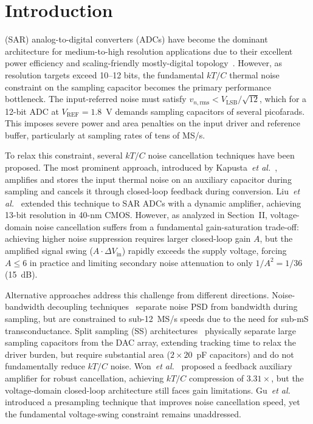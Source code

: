 \documentclass[journal]{IEEEtran}
\begin{document}
\section{Introduction}
 (SAR) analog-to-digital converters (ADCs) have become the dominant architecture for medium-to-high resolution applications due to their excellent power efficiency and scaling-friendly mostly-digital topology~\cite{murmann2015adc,harpe2019sar}. However, as resolution targets exceed 10--12 bits, the fundamental $kT/C$ thermal noise constraint on the sampling capacitor becomes the primary performance bottleneck. The input-referred noise must satisfy $v_{n,\text{rms}} < V_{\text{LSB}}/\sqrt{12}$, which for a 12-bit ADC at $V_{\text{REF}}=1.8$~V demands sampling capacitors of several picofarads. This imposes severe power and area penalties on the input driver and reference buffer, particularly at sampling rates of tens of MS/s.

To relax this constraint, several $kT/C$ noise cancellation techniques have been proposed. The most prominent approach, introduced by Kapusta~\textit{et al.}~\cite{kapusta2014sampling}, amplifies and stores the input thermal noise on an auxiliary capacitor during sampling and cancels it through closed-loop feedback during conversion. Liu~\textit{et al.}~\cite{liu202013bit} extended this technique to SAR ADCs with a dynamic amplifier, achieving 13-bit resolution in 40-nm CMOS. However, as analyzed in Section~II, voltage-domain noise cancellation suffers from a fundamental gain-saturation trade-off: achieving higher noise suppression requires larger closed-loop gain $A$, but the amplified signal swing ($A\cdot\Delta V_{\text{in}}$) rapidly exceeds the supply voltage, forcing $A\leq 6$ in practice and limiting secondary noise attenuation to only $1/A^2 = 1/36$ (15~dB).

Alternative approaches address this challenge from different directions. Noise-bandwidth decoupling techniques~\cite{li2020_SAR} separate noise PSD from bandwidth during sampling, but are constrained to sub-12~MS/s speeds due to the need for sub-mS transconductance. Split sampling (SS) architectures~\cite{huang2025split} physically separate large sampling capacitors from the DAC array, extending tracking time to relax the driver burden, but require substantial area ($2\times 20$~pF capacitors) and do not fundamentally reduce $kT/C$ noise. Won~\textit{et al.}~\cite{won2024_13b} proposed a feedback auxiliary amplifier for robust cancellation, achieving $kT/C$ compression of $3.31\times$, but the voltage-domain closed-loop architecture still faces gain limitations. Gu~\textit{et al.}~\cite{guImprovedKTNoise2024} introduced a presampling technique that improves noise cancellation speed, yet the fundamental voltage-swing constraint remains unaddressed.
\end{document}
